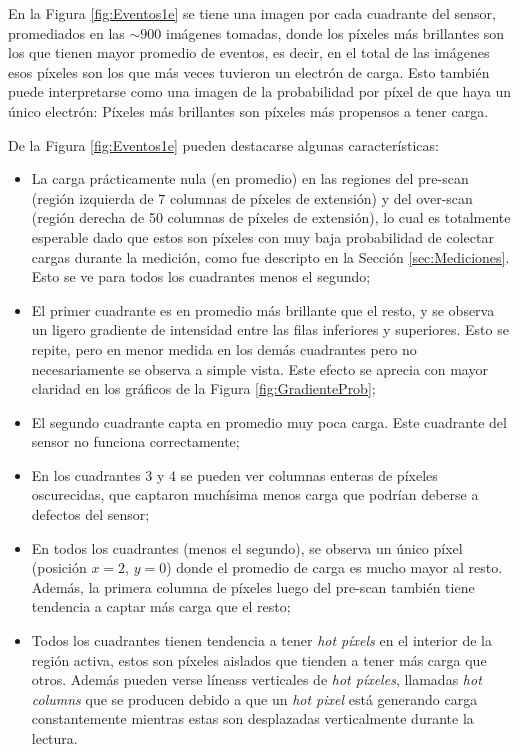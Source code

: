 En la Figura \ref{fig:Eventos1e} se tiene una imagen por cada cuadrante del sensor, promediados en las $\sim 900$ imágenes tomadas, donde los píxeles más brillantes son los que tienen mayor promedio de eventos, es decir, en el total de las imágenes esos píxeles son los que más veces tuvieron un electrón de carga. Esto también puede interpretarse como una imagen de la probabilidad por píxel de que haya un único electrón: Píxeles más brillantes son píxeles más propensos a tener carga.

De la Figura \ref{fig:Eventos1e} pueden destacarse algunas características:
\begin{itemize}
    \item La carga prácticamente nula (en promedio) en las regiones del pre-scan (región izquierda de $7$ columnas de píxeles de extensión) y del over-scan (región derecha de 50 columnas de píxeles de extensión), lo cual es totalmente esperable dado que estos son píxeles con muy baja probabilidad de colectar cargas durante la medición, como fue descripto en la Sección \ref{sec:Mediciones}. Esto se ve para todos los cuadrantes menos el segundo;
    \item El primer cuadrante es en promedio más brillante que el resto, y se observa un ligero gradiente de intensidad entre las filas inferiores y superiores. Esto se repite, pero en menor medida en los demás cuadrantes pero no necesariamente se observa a simple vista. Este efecto se aprecia con mayor claridad en los gráficos de la Figura \ref{fig:GradienteProb};
    \item El segundo cuadrante capta en promedio muy poca carga. Este cuadrante del sensor no funciona correctamente;
    \item En los cuadrantes $3$ y $4$ se pueden ver columnas enteras de píxeles oscurecidas, que captaron muchísima menos carga que podrían deberse a defectos del sensor;
    \item En todos los cuadrantes (menos el segundo), se observa un único píxel (posición $x = 2$, $y = 0$) donde el promedio de carga es mucho mayor al resto. Además, la primera columna de píxeles luego del pre-scan también tiene tendencia a captar más carga que el resto;
    \item Todos los cuadrantes tienen tendencia a tener \textit{hot píxels} en el interior de la región activa, estos son píxeles aislados que tienden a tener más carga que otros. Además pueden verse líneass verticales de \textit{hot píxeles}, llamadas \textit{hot columns} que se producen debido a que un \textit{hot pixel} está generando carga constantemente mientras estas son desplazadas verticalmente durante la lectura.
\end{itemize}
